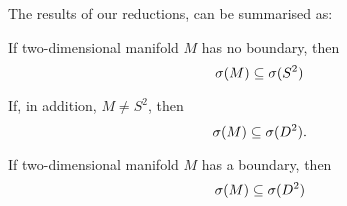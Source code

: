 

The results of our reductions, can be summarised as:
\begin{observation}\label{sum of spectras}
If two-dimensional manifold $M$ has no boundary, then
\begin{equation} 
{{\sigma}(M)} \subseteq {{\sigma}(S^2)} 
\end{equation} 

If, in addition, $M \neq S^2$, then 
\begin{equation} 
{{\sigma}(M)} \subseteq {{\sigma}(D^2)}. 
\end{equation}

\end{observation}
\begin{observation}
If two-dimensional manifold  $M$ has a boundary, then 
\begin{equation}
{{\sigma}(M)} \subseteq {{\sigma}(D^2)}
\end{equation}
\end{observation}

